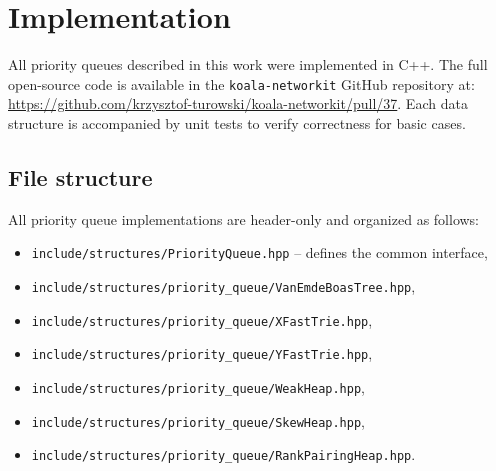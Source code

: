 \section{Implementation}

All priority queues described in this work were implemented in C++. The full open-source code is available in the \texttt{koala-networkit} GitHub repository at: \url{https://github.com/krzysztof-turowski/koala-networkit/pull/37}. Each data structure is accompanied by unit tests to verify correctness for basic cases.

\subsection{File structure}

All priority queue implementations are header-only and organized as follows:

\begin{itemize}
  \item \texttt{include/structures/PriorityQueue.hpp} – defines the common interface,
  \item \texttt{include/structures/priority\_queue/VanEmdeBoasTree.hpp},
  \item \texttt{include/structures/priority\_queue/XFastTrie.hpp},
  \item \texttt{include/structures/priority\_queue/YFastTrie.hpp},
  \item \texttt{include/structures/priority\_queue/WeakHeap.hpp},
  \item \texttt{include/structures/priority\_queue/SkewHeap.hpp},
  \item \texttt{include/structures/priority\_queue/RankPairingHeap.hpp}.
\end{itemize}
